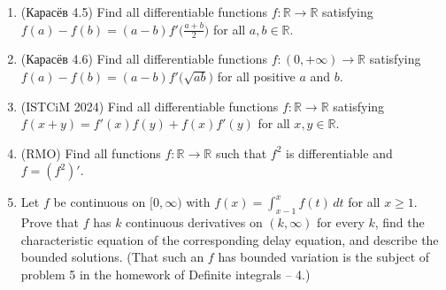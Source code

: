 \documentclass[11pt,a4paper]{article}
\renewcommand{\ge}{\geqslant}
\begin{document}
\begin{enumerate}[leftmargin=2.2em,itemsep=0.6em]
\item (\foreignlanguage{russian}{Карасёв} 4.5) Find all differentiable functions
$f\colon\mathbb R\to\mathbb R$ satisfying $f(a)-f(b)=(a-b)f'\bigl(\frac{a+b}2\bigr)$ for all
$a,b\in\mathbb R$.

\item (\foreignlanguage{russian}{Карасёв} 4.6) Find all differentiable functions
$f\colon(0,+\infty)\to\mathbb R$ satisfying $f(a)-f(b)=(a-b)f'\bigl(\sqrt{ab}\bigr)$ for all positive
$a$ and $b$.

\item (ISTCiM 2024) Find all differentiable functions $f\colon\mathbb R\to\mathbb R$ satisfying
$f(x+y)=f'(x)f(y)+f(x)f'(y)$ for all $x,y\in\mathbb R$.

\item (RMO) Find all functions $f\colon\mathbb R\to\mathbb R$ such that $f^2$ is differentiable and
$f=(f^2)'$.

\item Let $f$ be continuous on $[0,\infty)$ with $f(x)=\int_{x-1}^xf(t)\,dt$ for all $x\ge1$. Prove that
$f$ has $k$ continuous derivatives on $(k,\infty)$ for every $k$, find the characteristic equation of the
corresponding delay equation, and describe the bounded solutions. (That such an $f$ has bounded
variation is the subject of problem 5 in the homework of Definite integrals -- 4.)
\end{enumerate}
\end{document}
